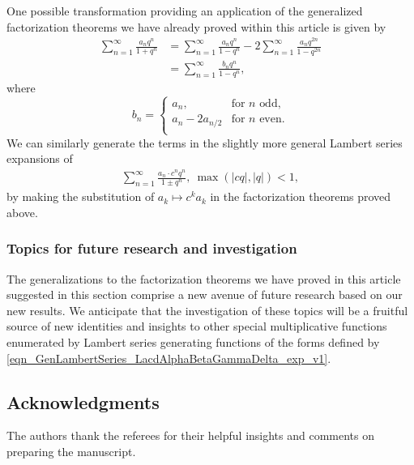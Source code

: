 \documentclass[10pt,reqno]{amsart}
\numberwithin{figure}{section}
\numberwithin{table}{section}
\theoremstyle{plain}
\numberwithin{theorem}{section}
\theoremstyle{remark}
\begin{document}
One possible transformation providing an application of the generalized factorization theorems we 
have already proved within this article is given by 
\begin{align*}
\sum_{n=1}^{\infty} \frac{a_n q^n}{1+q^n} 
&  = \sum_{n=1}^{\infty} \frac{a_n q^n}{1-q^n}  - 2\sum_{n=1}^{\infty} \frac{a_n q^{2n}}{1-q^{2n}} \\
&  = \sum_{n=1}^{\infty} \frac{b_n q^n}{1-q^n} ,
\end{align*}
where 
$$
b_n = \begin{cases}
a_n, & \text{for $n$ odd,}\\
a_n-2a_{n/2} & \text{for $n$ even.}\\
\end{cases}
$$
We can similarly generate the terms in the slightly more general Lambert series expansions of 
\begin{align*} 
\sum_{n=1}^{\infty} \frac{a_n \cdot c^n q^n}{1 \pm q^n},\ \max(|cq|, |q|) < 1, 
\end{align*} 
by making the substitution of $a_k \mapsto c^k a_k$ in the factorization theorems proved above. 

\subsubsection{Topics for future research and investigation} 

The generalizations to the factorization theorems we have proved in this article suggested in this 
section comprise a new avenue of future research based on our new results. 
We anticipate that the investigation of these topics will be a 
fruitful source of new identities and insights to other special multiplicative functions enumerated by 
Lambert series generating functions of the forms defined by 
\eqref{eqn_GenLambertSeries_LacdAlphaBetaGammaDelta_exp_v1}. 

\subsection*{Acknowledgments} 

The authors thank the referees for their helpful insights and comments on 
preparing the manuscript. 
\end{document}
